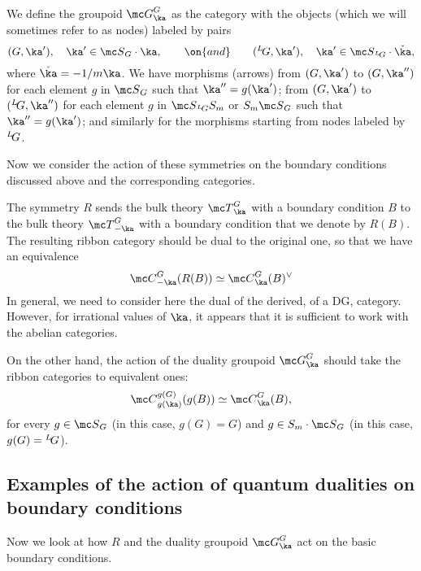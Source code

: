 \documentclass[11pt,reqno]{amsart}
\theoremstyle{plain}
\numberwithin{equation}{section}
\def\neg{\negthinspace}
\def\LG{{}^L\neg G}
\theoremstyle{definition}
\begin{document}

We define the groupoid ${\mc G}^G_\ka$ as the category with the
objects (which we will sometimes refer to as nodes) labeled by pairs
$$
(G,\ka'), \quad \ka' \in {\mc S}_G \cdot \ka, \qquad \on{and} \qquad
(\LG,\ka'), \quad \ka' \in {\mc S}_{\LG} \cdot \check\ka,
$$
where $\check\ka=-1/m\ka$. We have morphisms (arrows) from $(G,\ka')$
to $(G,\ka'')$ for each element $g$ in ${\mc S}_G$ such that $\ka'' =
g(\ka')$; from $(G,\ka')$ to $(\LG,\ka'')$ for each element $g$ in
${\mc S}_{\LG} S_m$ or $S_m{\mc S}_G$ such that $\ka'' = g(\ka')$; and
similarly for the morphisms starting from nodes labeled by $\LG$.


\bigskip

Now we consider the action of these symmetries on the boundary
conditions discussed above and the corresponding categories.

The symmetry $R$ sends the bulk theory ${\mc T}^G_\ka$ with a boundary
condition $B$ to the bulk theory ${\mc T}^G_{-\ka}$ with a boundary
condition that we denote by $R(B)$. The resulting ribbon category
should be dual to the original one, so that we have an equivalence
\begin{equation}    \label{dual}
{\mc C}^G_{-\ka}(R(B)) \simeq {\mc C}^G_\ka(B)^\vee
\end{equation}
In general, we need to consider here the dual of the derived, of a DG,
category. However, for irrational values of $\ka$, it appears that it
is sufficient to work with the abelian categories.

On the other hand, the action of the duality groupoid ${\mc G}^G_\ka$
should take the ribbon categories to equivalent ones:
$$
{\mc C}^{g(G)}_{g(\ka)}(g(B)) \simeq {\mc C}^G_\ka(B),
$$
for every $g \in {\mc S}_G$ (in this case, $g(G)=G$) and $g \in S_m
\cdot {\mc S}_G$ (in this case, $g(G)=\LG$).

\subsection{Examples of the action of quantum dualities  on boundary
  conditions}

Now we look at how $R$ and the duality groupoid ${\mc G}^G_\ka$ act on
the basic boundary conditions.
\end{document}

